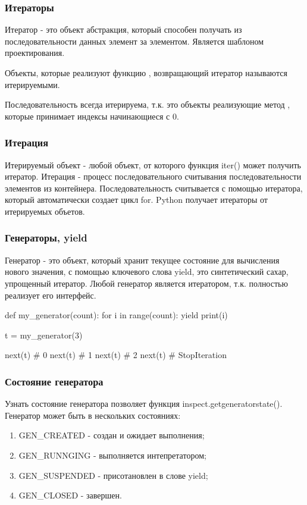 \subsubsection{Итераторы}

Итератор - это объект абстракция, который способен получать из последовательности данных элемент за элементом. Является шаблоном проектирования.

Объекты, которые реализуют функцию , возвращающий итератор называются итерируемыми. 

Последовательность всегда итерируема, т.к. это объекты реализующие метод , которые принимает индексы начинающиеся с 0.

\subsubsection{Итерация}

Итерируемый объект - любой объект, от которого функция iter() может получить итератор. 
Итерация - процесс последовательного считывания последовательности элементов из контейнера. Последовательность считывается с помощью итератора, который автоматически создает цикл for.
Python получает итераторы от итерируемых объетов.

\subsubsection{Генераторы, yield}

Генератор - это объект, который хранит текущее состояние для вычисления нового значения, с помощью ключевого слова yield, это синтетический сахар, упрощенный итератор. Любой генератор является итератором, т.к. полностью реализует его интерфейс.

\begin{python}
def my_generator(count):
    for i in range(count):
        yield print(i)

t = my_generator(3)

next(t) # 0
next(t) # 1
next(t) # 2
next(t) # StopIteration

\end{python}

\subsubsection{Состояние генератора}

Узнать состояние генератора позволяет функция inspect.getgeneratorstate().
Генератор может быть в нескольких состояниях:
\begin{enumerate}
    \item GEN\_CREATED - создан и ожидает выполнения;
    \item GEN\_RUNNGING - выполняется интепретатором;
    \item GEN\_SUSPENDED - присотановлен в слове yield;
    \item GEN\_CLOSED - завершен.
\end{enumerate}

